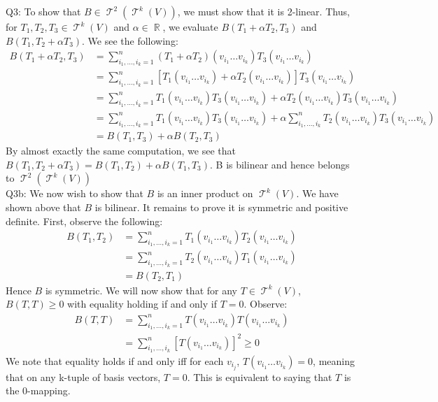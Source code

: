 \documentclass[letterpaper]{article}
\DeclareMathOperator{\T}{\mathcal{T}}
\DeclareMathOperator{\R}{\mathbb{R}}
\begin{document}
\noindent Q3: To show that $B\in \T^2(\T^k(V))$, we must show that it is 2-linear. Thus, for $T_1,T_2,T_3\in \T^k(V)$ and $\alpha\in \R$, we evaluate $B(T_1 + \alpha T_2,T_3)$ and $B(T_1,T_2 + \alpha T_3)$. We see the following: 
\begin{align*}
    B(T_1 + \alpha T_2,T_3) & = \sum_{i_1,\dots , i_k = 1}^n (T_1 + \alpha T_2)(v_{i_1}\dots v_{i_k})T_3(v_{i_1}\dots v_{i_k})
    \\ & = \sum_{i_1,\dots , i_k = 1}^n [T_1(v_{i_1}\dots v_{i_k}) + \alpha T_2(v_{i_1}\dots v_{i_k})] T_3(v_{i_1}\dots v_{i_k})
    \\ & = \sum_{i_1,\dots ,i_k=1}^n T_1(v_{i_1}\dots v_{i_k}) T_3(v_{i_1}\dots v_{i_k}) + \alpha T_2(v_{i_1}\dots v_{i_k}) T_3(v_{i_1}\dots v_{i_k})
    \\ & = \sum_{i_1,\dots ,i_k=1}^n T_1(v_{i_1}\dots v_{i_k}) T_3(v_{i_1}\dots v_{i_k}) + \alpha \sum_{i_1,\dots ,i_k}^n T_2(v_{i_1}\dots v_{i_k}) T_3 (v_{i_1}\dots v_{i_k})
    \\ & = B(T_1,T_3) + \alpha B(T_2,T_3)
\end{align*}
By almost exactly the same computation, we see that $B(T_1,T_2+\alpha T_3) = B(T_1,T_2) + \alpha B(T_1,T_3)$. B is bilinear and hence belongs to $\T^2(\T^k(V))$
\newline \\ Q3b: We now wish to show that $B$ is an inner product on $\T^k(V)$. We have shown above that $B$ is bilinear. It remains to prove it is symmetric and positive definite. First, observe the following: 
\begin{align*}
    B(T_1,T_2) & = \sum_{i_1,\dots ,i_k = 1}^n T_1(v_{i_1}\dots v_{i_k}) T_2(v_{i_1}\dots v_{i_k})
    \\ & = \sum_{i_1,\dots ,i_k=1}^n T_2 (v_{i_1}\dots v_{i_k}) T_1 (v_{i_1}\dots v_{i_k})
    \\ & = B(T_2,T_1)
\end{align*} Hence $B$ is symmetric. We will now show that for any $T\in \T^k(V)$, $B(T,T)\geq 0$ with equality holding if and only if $T=0$. Observe: 
\begin{align*}
    B(T,T) & = \sum_{i_1,\dots ,i_k =1}^n T(v_{i_1}\dots v_{i_k}) T(v_{i_1}\dots v_{i_k})
    \\ & = \sum_{i_1,\dots ,i_k}^n [T(v_{i_1}\dots v_{i_k})]^2 \geq 0
\end{align*}We note that equality holds if and only iff for each $v_{i_j}$, $T(v_{i_1}\dots v_{i_k})=0$, meaning that on any k-tuple of basis vectors, $T=0$. This is equivalent to saying that $T$ is the 0-mapping. 
\end{document}
